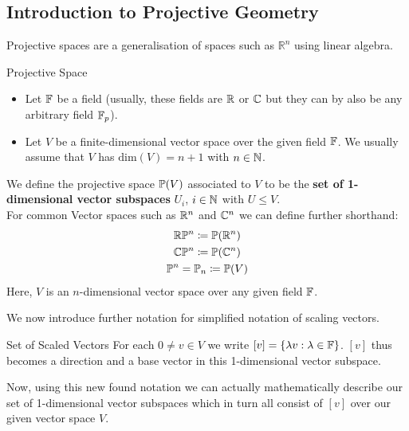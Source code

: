 \subsection{Introduction to Projective Geometry}

Projective spaces are a generalisation of spaces such as $\mathbb{R}^n$ using linear algebra. 

\begin{definitionBox}{Projective Space}    
    \begin{itemize}
        \item Let $\mathbb{F}$ be a field (usually, these fields are $\mathbb{R}$ or $\mathbb{C}$ but they can by also be any arbitrary field $\mathbb{F}_p$).
        \item Let $V$ be a finite-dimensional vector space over the given field $\mathbb{F}$. We usually assume that $V$ has $\mathrm{dim}(V) = n +1$ with $n \in \mathbb{N}$.
    \end{itemize}  

    We define the projective space $\mathbb{P}(V)$ associated to $V$ to be the \textbf{set of 1-dimensional vector subspaces} $U_i$, $i \in \mathbb{N}$ with $U \leq V$. \\
    For common Vector spaces such as $\mathbb{R}^n$ and $\mathbb{C}^n$ we can define further shorthand:
    \begin{gather*}
        \mathbb{R}\mathbb{P}^n \coloneq \mathbb{P}(\mathbb{R}^n) \\
        \mathbb{C}\mathbb{P}^n \coloneq \mathbb{P}(\mathbb{C}^n) \\
        \mathbb{P}^n = \mathbb{P}_n \coloneq \mathbb{P}(V) 
    \end{gather*}
    Here, $V$ is an $n$-dimensional vector space over any given field $\mathbb{F}$.
\end{definitionBox}



We now introduce further notation for simplified notation of scaling vectors.

\begin{definitionBox}{Set of Scaled Vectors}
    For each $0 \neq v \in V$ we write $[v] = \{\lambda v: \lambda \in \mathbb{F}\}$.
    $[v]$ thus becomes a direction and a base vector in this 1-dimensional vector subspace.
\end{definitionBox}



Now, using this new found notation we can actually mathematically describe our set of 1-dimensional vector subspaces which in turn all consist of $[v]$ over our given vector space $V$.


